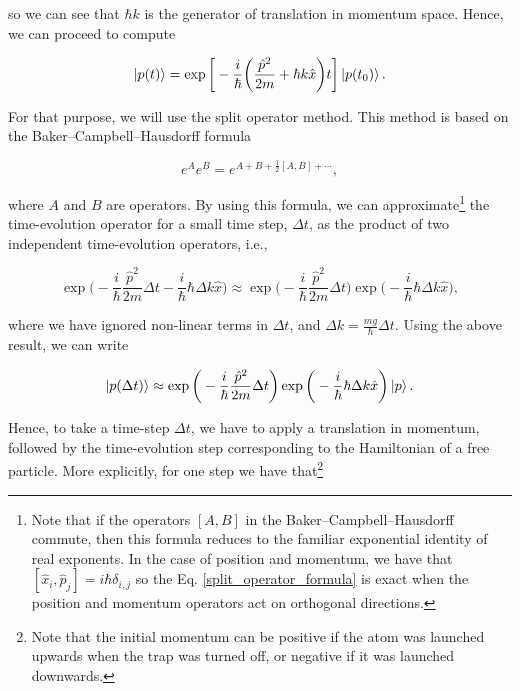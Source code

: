 \documentclass{article}
\begin{document}
so we can see that $\hbar k$ is the generator of translation in momentum space. Hence, we can proceed to compute

\begin{equation}
    \ket{p(t)} = \exp \bigg[-\frac{i}{\hbar} \bigg( \frac{\hat{p}^{2}}{2m} + \hbar k \hat{x} \bigg) t \bigg] \ket{p(t_{0})}.
\end{equation}

For that purpose, we will use the split operator method. This method is based on the Baker–Campbell–Hausdorff formula

\begin{equation}
    e^{A}e^{B} = e^{A+B+\frac{1}{2}[A, B] + \cdots},
\end{equation}

where $A$ and $B$ are operators. By using this formula, we can approximate\footnote{Note that if the operators $[A,B]$ in the Baker–Campbell–Hausdorff commute, then this formula reduces to the familiar exponential identity of real exponents. In the case of position and momentum, we have that $[\hat{x}_{i},\hat{p}_{j}]=i\hbar \delta_{i,j}$ so the Eq. \ref{split_operator_formula} is exact when the position and momentum operators act on orthogonal directions.} the time-evolution operator for a small time step, $\Delta t$, as the product of two independent time-evolution operators, i.e.,

\begin{equation}\label{split_operator_formula}
    \exp \bigg(-\frac{i}{\hbar} \frac{\hat{p}^{2}}{2m} \Delta t - \frac{i}{\hbar} \hbar \Delta k \hat{x} \bigg) \approx \exp \bigg( -\frac{i}{\hbar} \frac{\hat{p}^{2}}{2m} \Delta t \bigg) \exp \bigg(- \frac{i}{\hbar} \hbar \Delta k \hat{x} \bigg),
\end{equation}

where we have ignored non-linear terms in $\Delta t$, and $\Delta k = \frac{mg}{\hbar} \Delta t$. Using the above result, we can write

\begin{equation}
    \ket{p(\Delta t)} \approx \exp \bigg( -\frac{i}{\hbar} \frac{\hat{p}^{2}}{2m} \Delta t \bigg) \exp \bigg(- \frac{i}{\hbar} \hbar \Delta k \hat{x} \bigg) \ket{p}.
\end{equation}

Hence, to take a time-step $\Delta t$, we have to apply a translation in momentum, followed by the time-evolution step corresponding to the Hamiltonian of a free particle. More explicitly, for one step we have that\footnote{Note that the initial momentum can be positive if the atom was launched upwards when the trap was turned off, or negative if it was launched downwards.}
\end{document}
